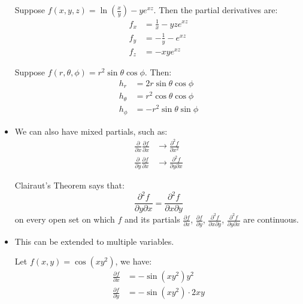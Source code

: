 \begin{itemize}
\begin{center}
    \end{center}
    \begin{example}
        Suppose $f(x,y,z)=\ln\left(\frac{x}{y}\right) - ye^{xz}$. Then the partial derivatives are:
        \begin{align}
            f_x &= \frac{1}{x} - yze^{xz} \\ 
            f_y &= -\frac{1}{y} - e^{xz} \\ 
            f_z &= -xye^{xz}
        \end{align}
    \end{example}
    \begin{example}
        Suppose $f(r,\theta,\phi) = r^2\sin\theta \cos\phi$. Then:
        \begin{align}
            h_r &= 2r\sin\theta \cos\phi \\ 
            h_\theta &= r^2\cos\theta\cos\phi \\ 
            h_\phi &= -r^2\sin\theta\sin\phi
        \end{align}
    \end{example}
    \item We can also have mixed partials, such as:
    \begin{align}
        \frac{\partial}{\partial x} \frac{\partial f}{\partial x} &\to \frac{\partial^2 f}{\partial x^2} \\ 
        \frac{\partial}{\partial y} \frac{\partial f}{\partial x} &\to \frac{\partial^2 f}{\partial y\partial x}
    \end{align}
    \begin{theorem}
        Clairaut's Theorem says that:
        \begin{equation}
            \frac{\partial^2 f}{\partial y\partial x} = \frac{\partial^2 f}{\partial x\partial y}
        \end{equation}
        on every open set on which $f$ and its partials $\frac{\partial f}{\partial x}$, $\frac{\partial f}{\partial y}$, $\frac{\partial^2 f}{\partial x\partial y}$, $\frac{\partial^2 f}{\partial y\partial x}$ are continuous.
    \end{theorem}
    \item This can be extended to multiple variables.
    \begin{example}
        Let $f(x,y)=\cos(xy^2)$, we have:
        \begin{align}
            \frac{\partial f}{\partial x} &= -\sin(xy^2)y^2 \\ 
            \frac{\partial f}{\partial y} &= -\sin(xy^2)\cdot 2xy \\ 

\end{align}
\end{example}
\end{itemize}
